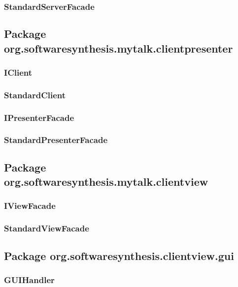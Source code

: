 \subsubsection{StandardServerFacade}

\subsection{Package org.softwaresynthesis.mytalk.clientpresenter}

\subsubsection{IClient}

\subsubsection{StandardClient}

\subsubsection{IPresenterFacade}

\subsubsection{StandardPresenterFacade}

\subsection{Package org.softwaresynthesis.mytalk.clientview}

\subsubsection{IViewFacade}

\subsubsection{StandardViewFacade}

\subsection{Package org.softwaresynthesis.clientview.gui}

\subsubsection{GUIHandler}

